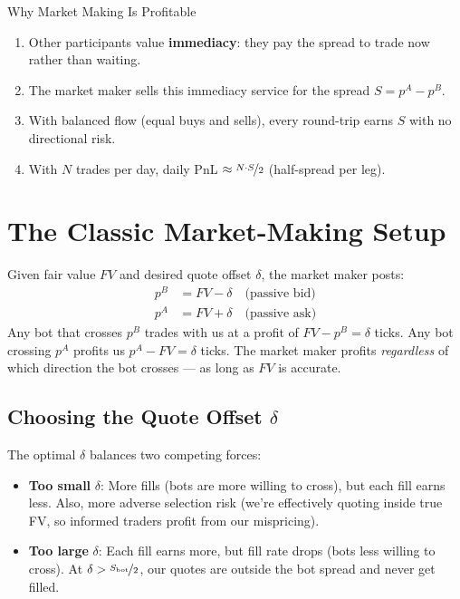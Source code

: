 \documentclass[12pt,a4paper,openany]{report}
\theoremstyle{definition}
\begin{document}
\begin{keyconceptbox}{Why Market Making Is Profitable}
\begin{enumerate}[label=\arabic*.]
  \item Other participants value \textbf{immediacy}: they pay the spread to trade now rather than waiting.
  \item The market maker sells this immediacy service for the spread $S = p^A - p^B$.
  \item With balanced flow (equal buys and sells), every round-trip earns $S$ with no directional risk.
  \item With $N$ trades per day, daily PnL $\approx \nicefrac{N \cdot S}{2}$ (half-spread per leg).
\end{enumerate}
\end{keyconceptbox}

\section{The Classic Market-Making Setup}

Given fair value $FV$ and desired quote offset $\delta$, the market maker posts:
\begin{align}
  p^B &= FV - \delta \quad\text{(passive bid)}\\
  p^A &= FV + \delta \quad\text{(passive ask)}
\end{align}
Any bot that crosses $p^B$ trades with us at a profit of $FV - p^B = \delta$ ticks. Any bot crossing $p^A$ profits us $p^A - FV = \delta$ ticks. The market maker profits \emph{regardless} of which direction the bot crosses — as long as $FV$ is accurate.

\subsection{Choosing the Quote Offset $\delta$}

The optimal $\delta$ balances two competing forces:
\begin{itemize}
  \item \textbf{Too small} $\delta$: More fills (bots are more willing to cross), but each fill earns less. Also, more adverse selection risk (we're effectively quoting inside true FV, so informed traders profit from our mispricing).
  \item \textbf{Too large} $\delta$: Each fill earns more, but fill rate drops (bots less willing to cross). At $\delta > \nicefrac{S_{\text{bot}}}{2}$, our quotes are outside the bot spread and never get filled.
\end{itemize}
\end{document}
